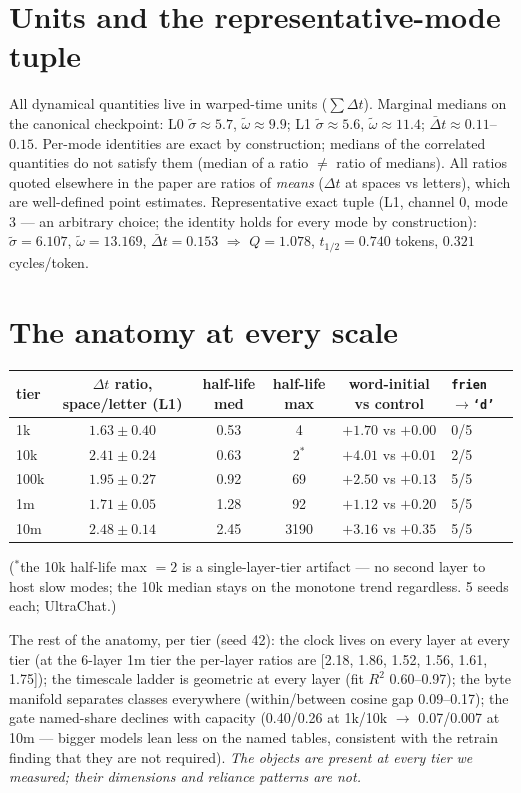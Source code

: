 \documentclass[11pt]{article}
\newcommand{\Dt}{\Delta t}
\begin{document}
\section{Units and the representative-mode tuple}

All dynamical quantities live in warped-time units ($\sum \Dt$). Marginal
medians on the canonical checkpoint: L0 $\tilde\sigma \approx 5.7$,
$\tilde\omega \approx 9.9$; L1 $\tilde\sigma \approx 5.6$,
$\tilde\omega \approx 11.4$; $\bar\Dt \approx 0.11$--$0.15$. Per-mode
identities are exact by construction; medians of the correlated quantities
do not satisfy them (median of a ratio $\neq$ ratio of medians). All
ratios quoted elsewhere in the paper are ratios of \emph{means}
($\Dt$ at spaces vs letters), which are well-defined point estimates.
Representative exact tuple (L1, channel 0, mode 3 --- an arbitrary choice;
the identity holds for every mode by construction): $\tilde\sigma = 6.107$,
$\tilde\omega = 13.169$, $\bar\Dt = 0.153$ $\Rightarrow$ $Q = 1.078$,
$t_{1/2} = 0.740$ tokens, $0.321$ cycles/token.

\section{The anatomy at every scale}

\begin{center}
\small
\begin{tabular}{lccccl}
\toprule
tier & $\Dt$ ratio, space/letter (L1) & half-life med & half-life max & word-initial vs control & \texttt{frien$\to$`d'} \\
\midrule
1k & $1.63 \pm 0.40$ & 0.53 & 4 & $+1.70$ vs $+0.00$ & 0/5 \\
10k & $2.41 \pm 0.24$ & 0.63 & 2$^*$ & $+4.01$ vs $+0.01$ & 2/5 \\
100k & $1.95 \pm 0.27$ & 0.92 & 69 & $+2.50$ vs $+0.13$ & 5/5 \\
1m & $1.71 \pm 0.05$ & 1.28 & 92 & $+1.12$ vs $+0.20$ & 5/5 \\
10m & $2.48 \pm 0.14$ & 2.45 & 3190 & $+3.16$ vs $+0.35$ & 5/5 \\
\bottomrule
\end{tabular}
\end{center}
($^*$the 10k half-life max $=2$ is a single-layer-tier artifact --- no
second layer to host slow modes; the 10k median stays on the monotone
trend regardless. 5 seeds each; UltraChat.)

The rest of the anatomy, per tier (seed 42): the clock lives on every
layer at every tier (at the 6-layer 1m tier the per-layer ratios are
[2.18, 1.86, 1.52, 1.56, 1.61, 1.75]); the timescale ladder is geometric
at every layer (fit $R^2$ 0.60--0.97); the byte manifold separates classes
everywhere (within/between cosine gap 0.09--0.17); the gate named-share
declines with capacity (0.40/0.26 at 1k/10k $\to$ 0.07/0.007 at 10m ---
bigger models lean less on the named tables, consistent with the retrain
finding that they are not required). \emph{The objects are present at
every tier we measured; their dimensions and reliance patterns are not.}
\end{document}
